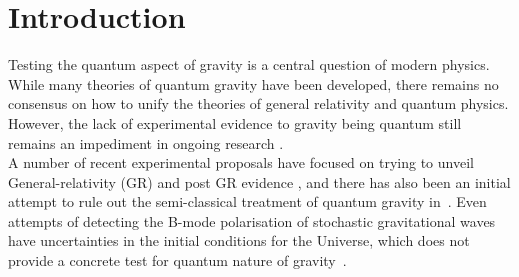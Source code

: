 \documentclass[%
 12pt,
 superscriptaddress,
 amsmath,
 amssymb,
 onecolumn,
 longbibliography
]{revtex4-2}
\begin{document}
\maketitle


\section{Introduction}

Testing the quantum aspect of gravity is a central question of modern physics. While many theories of quantum gravity have been developed, there remains no consensus on how to unify the theories of general relativity and quantum physics. However, the lack of experimental evidence to gravity being quantum still remains an impediment in ongoing research \cite{Kiefer2012}. \\
\indent A number of recent experimental proposals have focused on trying to unveil General-relativity (GR) and post GR evidence \cite{Colella:1975dq,Nesvizhevsky:2003at,Stickler2018, Pikovski2012, Krisnanda2019, Howl2019, Carlesso2019, Altamirano2018,Marshman:2018upe}, and there has also been an initial attempt to rule out the semi-classical treatment of quantum gravity in~\cite{Page:1981aj}. Even attempts of detecting the B-mode polarisation of stochastic gravitational waves have uncertainties in the initial conditions for the Universe, which does not provide a concrete test for quantum nature of gravity~\cite{Ashoorioon:2012kh}.
\end{document}
